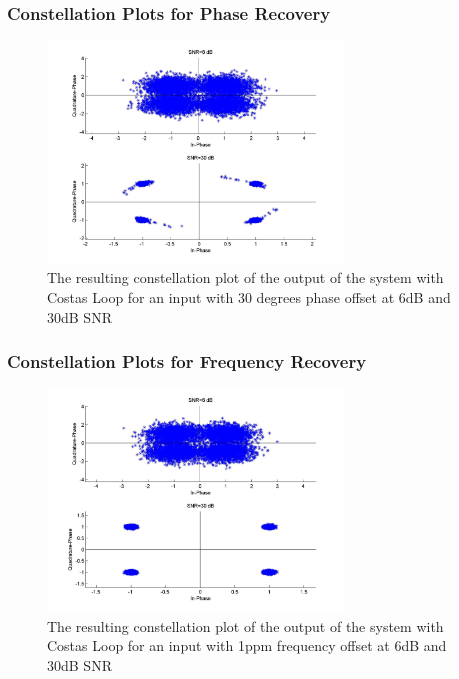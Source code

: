 \documentclass[]{article}
\begin{document}
\subsubsection{Constellation Plots  for Phase Recovery}
\begin{figure}[H]
\centering
\hspace*{-2cm}\includegraphics[width=0.7\textwidth]{qpConstpo_costas1.jpg}
\caption{The resulting constellation plot of the output of the system with Costas Loop for an input with 30 degrees phase offset at 6dB and 30dB SNR \label{fig:costasConstPhase} }
\end{figure}


\subsubsection{Constellation Plots  for Frequency Recovery}
\begin{figure}[H]
\centering
\hspace*{-2cm}\includegraphics[width=0.7\textwidth]{qpConstfo_costas1.jpg}
\caption{The resulting constellation plot of the output of the system with Costas Loop for an input with 1ppm frequency offset at 6dB and 30dB SNR \label{fig:costasConstFreq1} }
\end{figure}
\end{document}
